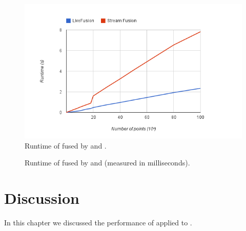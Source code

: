 \documentclass[preamble.tex]{subfiles}
\begin{document}
\begin{figure}
\includegraphics[center]{img/Eval-FarAndAboves}
\caption{Runtime of \FilterMax fused by \StreamFusion and \LiveFusion.}
\label{fig:Eval-FarAndAboves}
\end{figure}

\begin{figure}
\caption{Runtime of \FilterMax fused by \StreamFusion and \LiveFusion (measured in milliseconds).}
\label{fig:Eval-FarAndAboves-numbers}
\end{figure}



\clearpage
\section{Discussion}

In this chapter we discussed the performance of \LiveFusion applied to \QuickHull.



\IfNotCompilingAll{}
\end{document}
